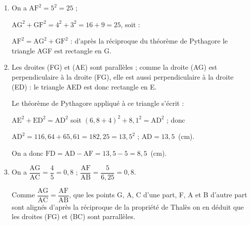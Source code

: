 
\medskip

%
%
%
%

\begin{enumerate}
\item %
On a $\text{AF}^2 = 5^2 = 25$ ;

$\text{AG}^2 + \text{GF}^2 = 4^2 + 3^2 = 16 + 9 = 25$, soit :

$\text{AF}^2 =\text{AG}^2 + \text{GF}^2$ : d'après la réciproque du théorème de Pythagore le triangle AGF est rectangle en G.
\item %
Les droites (FG) et (AE) sont parallèles ; comme la droite (AG) est perpendiculaire à  la droite (FG), elle est aussi perpendiculaire à  la droite (ED) : le triangle AED est donc rectangle en E.

Le théorème de Pythagore appliqué à  ce triangle s'écrit :

$\text{AE}^2 + \text{ED}^2 = \text{AD}^2$ soit $(6,8 + 4)^2 + 8,1^2 = \text{AD}^2$ ; donc 

$\text{AD}^2 = 116,64 + 65,61 = 182,25 = 13,5^2$ ;  $\text{AD} = 13,5$~(cm).

On a donc $\text{FD} = \text{AD} - \text{AF} = 13,5 - 5 = 8,5$~(cm).
\item %
On a $\dfrac{\text{AG}}{\text{AC}} =  \dfrac{4}{5} = 0,8$ ; $\dfrac{\text{AF}}{\text{AB}} =  \dfrac{5}{6,25} = 0,8$.

Comme $\dfrac{\text{AG}}{\text{AC}} = \dfrac{\text{AF}}{\text{AB}}$, que les points G, A, C d'une part, F, A et B d'autre part sont alignés d'après la réciproque de la propriété de Thalès on en déduit que les droites (FG) et (BC) sont parrallèles.
\end{enumerate}

\vspace{0,5cm}

